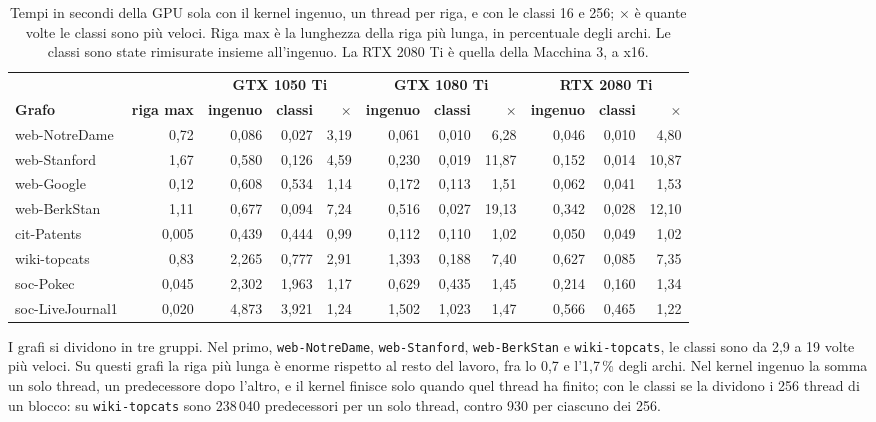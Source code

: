 \documentclass[11pt,a4paper]{article}
\newcommand{\stacco}{\par\medskip\noindent}
\begin{document}
\begin{table}[h]
\centering
\caption{Tempi in secondi della GPU sola con il kernel ingenuo, un thread per
riga, e con le classi 16 e 256; $\times$ è quante volte le classi sono più
veloci. Riga max è la lunghezza della riga più lunga, in percentuale degli
archi. Le classi sono state rimisurate insieme all'ingenuo.
La RTX 2080 Ti è quella della Macchina 3, a x16.}
\label{tab:granularita}
\small
\setlength{\tabcolsep}{3.5pt}
\begin{tabular}{@{}lrrrrrrrrrr@{}}
\toprule
 & & \multicolumn{3}{c}{\textbf{GTX 1050 Ti}} &
\multicolumn{3}{c}{\textbf{GTX 1080 Ti}} &
\multicolumn{3}{c}{\textbf{RTX 2080 Ti}} \\
\cmidrule(lr){3-5}\cmidrule(lr){6-8}\cmidrule(l){9-11}
\textbf{Grafo} & \textbf{riga max} & \textbf{ingenuo} & \textbf{classi} &
$\times$ & \textbf{ingenuo} & \textbf{classi} & $\times$ &
\textbf{ingenuo} & \textbf{classi} & $\times$ \\
\midrule
web-NotreDame    & 0,72  & 0,086 & 0,027 & 3,19 & 0,061 & 0,010 & 6,28  & 0,046 & 0,010 & 4,80  \\
web-Stanford     & 1,67  & 0,580 & 0,126 & 4,59 & 0,230 & 0,019 & 11,87 & 0,152 & 0,014 & 10,87 \\
web-Google       & 0,12  & 0,608 & 0,534 & 1,14 & 0,172 & 0,113 & 1,51  & 0,062 & 0,041 & 1,53  \\
web-BerkStan     & 1,11  & 0,677 & 0,094 & 7,24 & 0,516 & 0,027 & 19,13 & 0,342 & 0,028 & 12,10 \\
cit-Patents      & 0,005 & 0,439 & 0,444 & 0,99 & 0,112 & 0,110 & 1,02  & 0,050 & 0,049 & 1,02  \\
wiki-topcats     & 0,83  & 2,265 & 0,777 & 2,91 & 1,393 & 0,188 & 7,40  & 0,627 & 0,085 & 7,35  \\
soc-Pokec        & 0,045 & 2,302 & 1,963 & 1,17 & 0,629 & 0,435 & 1,45  & 0,214 & 0,160 & 1,34  \\
soc-LiveJournal1 & 0,020 & 4,873 & 3,921 & 1,24 & 1,502 & 1,023 & 1,47  & 0,566 & 0,465 & 1,22  \\
\bottomrule
\end{tabular}
\end{table}

\stacco
I grafi si dividono in tre gruppi. Nel primo, \texttt{web-NotreDame},
\texttt{web-Stanford}, \texttt{web-BerkStan} e \texttt{wiki-topcats}, le classi
sono da 2,9 a 19 volte più veloci. Su questi grafi la riga più lunga è enorme
rispetto al resto del lavoro, fra lo 0,7 e l'1,7\,\% degli archi. Nel kernel
ingenuo la somma un solo thread, un predecessore dopo l'altro, e il kernel
finisce solo quando quel thread ha finito; con le classi se la dividono i 256
thread di un blocco: su \texttt{wiki-topcats} sono 238\,040 predecessori per
un solo thread, contro 930 per ciascuno dei 256.
\end{document}
